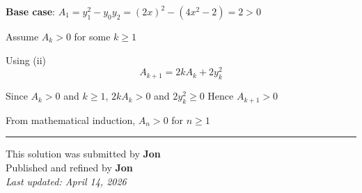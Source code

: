 ﻿\documentclass[12pt]{article}
\begin{document}
\textbf{Base case}: $A_1=y_1^2-y_0 y_2=(2x)^2-(4x^2-2)=2>0$

Assume $A_k>0$ for some $k\geq 1$

Using (ii)
$$A_{k+1}=2kA_k+2y_k^2$$

Since $A_k>0$ and $k\geq 1$, $2kA_k>0$ and $ 2y_k^2\geq 0$ Hence $A_{k+1}>0$

From mathematical induction, $A_n>0$ for $n\geq 1$

\bigskip
\hrule
\begin{center}
    This solution was submitted by \textbf{Jon}\\[4pt]
    Published and refined by \textbf{Jon}\\[8pt]
	\textit{Last updated: April 14, 2026}
\end{center}
\end{document}
